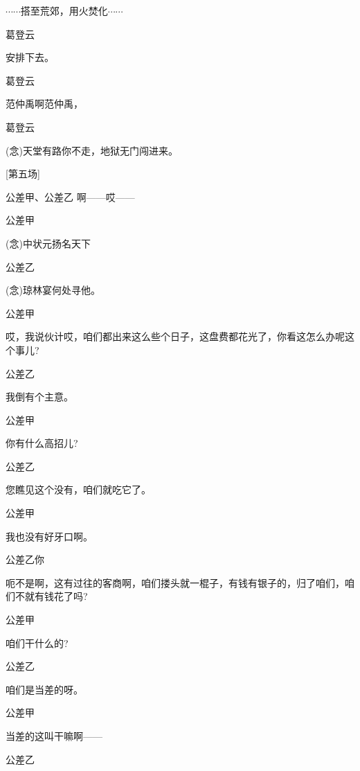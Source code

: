 $\cdots{}\cdots{}$搭至荒郊，用火焚化$\cdots{}\cdots{}$

葛登云\hspace{20pt}~

安排下去。

葛登云\hspace{20pt}~

范仲禹啊范仲禹，

葛登云\hspace{20pt}~

({\akai 念})天堂有路你不走，地狱无门闯进来。

{{[}第五场{]}}

公差甲、公差乙 啊------哎------

公差甲\hspace{20pt}~

({\akai 念})中状元扬名天下

公差乙\hspace{20pt}~

({\akai 念})琼林宴何处寻他。

公差甲

哎，我说伙计哎，咱们都出来这么些个日子，这盘费都花光了，你看这怎么办呢这个事儿?

公差乙\hspace{20pt}~

我倒有个主意。

公差甲\hspace{20pt}~

你有什么高招儿?

公差乙\hspace{20pt}~

您瞧见这个没有，咱们就吃它了。

公差甲\hspace{20pt}~

我也没有好牙口啊。

公差乙你

呃不是啊，这有过往的客商啊，咱们搂头就一棍子，有钱有银子的，归了咱们，咱们不就有钱花了吗?

公差甲\hspace{20pt}~

咱们干什么的?

公差乙\hspace{20pt}~

咱们是当差的呀。

公差甲\hspace{20pt}~

当差的这叫干嘛啊------

公差乙\hspace{20pt}~

